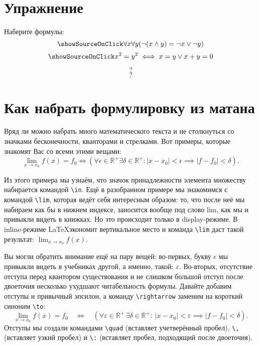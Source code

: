 \section{Упражнение}
\begin{staticpart}
Наберите формулы: \[\showSourceOnClick  \forall x\forall y(\lnot (x\land y)=\lnot x\lor \lnot y) \] \[\showSourceOnClick  x^2 = y^2 \iff x=y \lor x+y=0 \]
\end{staticpart}
\[ ? \]
\[ ? \]

\section{Как набрать формулировку из матана}
\par Вряд ли можно набрать много математического текста и не столкнуться со значками бесконечности, кванторами и стрелками. Вот примеры, которые знакомят Вас со всеми этими вещами:
\[\lim_{x\rightarrow x_0}f(x)=f_0 \iff ( \forall \epsilon\in\mathbb{R}^+ \exists \delta\in\mathbb{R}^+: |x-x_0|<\epsilon \implies |f-f_0|<\delta ). \]
\par Из этого примера мы узнаём, что значок принадлежности элемента множеству набирается командой \verb"\in". Ещё в разобранном примере мы знакомимся с командой \verb"\lim"\index{\lim}, которая ведёт себя интересным образом: то, что после неё мы набираем как бы в нижнем индексе, заносится вообще под слово lim, как мы и привыкли видеть в книжках. Но это происходит только в display-режиме. В inline-режиме \LaTeX экономит вертикальное место и команда \verb"\lim" даст такой результат: \( \lim_{x\rightarrow x_0}f(x) \).
\par Вы могли обратить внимание ещё на пару вещей: во-первых, букву \( \epsilon \) мы привыкли видеть в учебниках другой, а именно, такой: \( \varepsilon \). Во-вторых, отсутствие отступа перед квантором существования и не слишком большой отступ после двоеточия несколько ухудшают читабельность формулы. Давайте добавим отступы и привычный эпсилон, а команду \verb"\rightarrow" заменим на короткий синоним \verb"\to":
\[\lim_{x\to x_0}f(x)=f_0\quad \iff\quad ( \forall \varepsilon\in\mathbb{R}^+ \, \exists \delta\in\mathbb{R}^+:\: |x-x_0|<\varepsilon \implies |f-f_0|<\delta ). \]
Отступы мы создали командами \verb"\quad" (вставляет учетверённый пробел), \verb"\," (вставляет узкий пробел) и \verb"\:" (вставляет пробел, подходящий после двоеточия).

